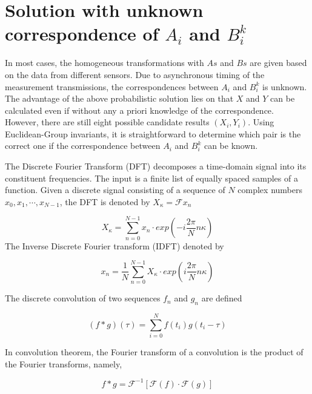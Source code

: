 \documentclass[letterpaper, 10 pt, conference]{ieeeconf}  %
\begin{document}
\section{Solution with unknown correspondence of $A_{i}$ and $B_{i}^{k}$}
\label{sect3}

In most cases, the homogeneous transformations with $As$ and $Bs$ are given based on the data from different sensors. Due to asynchronous timing of the measurement transmissions, the correspondences between $A_{i}$ and $B_{i}^{k}$ is unknown. The advantage of the above probabilistic solution lies on that $X$ and $Y$ can be calculated even if without any a priori knowledge of the correspondence. However, there are still eight possible candidate results $(X_{i},Y_{i})$. Using Euclidean-Group invariants, it is straightforward to determine which pair is the correct one if the correspondence between $A_{i}$ and $B_{i}^{k}$ can be known.

The Discrete Fourier Transform (DFT) decomposes a time-domain signal into its constituent frequencies. The input is a finite list of equally spaced samples of a function. Given a discrete signal consisting of a sequence of $N$ complex numbers $x_{0},x_{1},\cdots,x_{N-1}$, the DFT is denoted by $X_{\kappa} = \mathcal{F}{x_{n}}$

\begin{equation}\label{equ21}
    X_{\kappa} = \sum_{n=0}^{N-1}x_{n}\cdot exp(-i\frac{2\pi}{N}n\kappa)
\end{equation}
The Inverse Discrete Fourier transform (IDFT) denoted by

\begin{equation}\label{equ22}
    x_{n} = \frac{1}{N}\sum_{n=0}^{N-1}X_{\kappa}\cdot exp(i\frac{2\pi}{N}n\kappa)
\end{equation}

The discrete convolution of two sequences $f_{n}$ and $g_{n}$  are defined

\begin{equation}\label{equ23}
    (f \ast g)(\tau)=\sum_{i=0}^{N}f(t_{i})g(t_{i}-\tau)
\end{equation}

In convolution theorem, the Fourier transform of a convolution is the product of the Fourier transforms, namely,

\begin{equation}\label{equ24}
    f \ast g = \mathcal{F}^{-1} [\mathcal{F}(f) \cdot \mathcal{F}(g)]
\end{equation}
\end{document}
